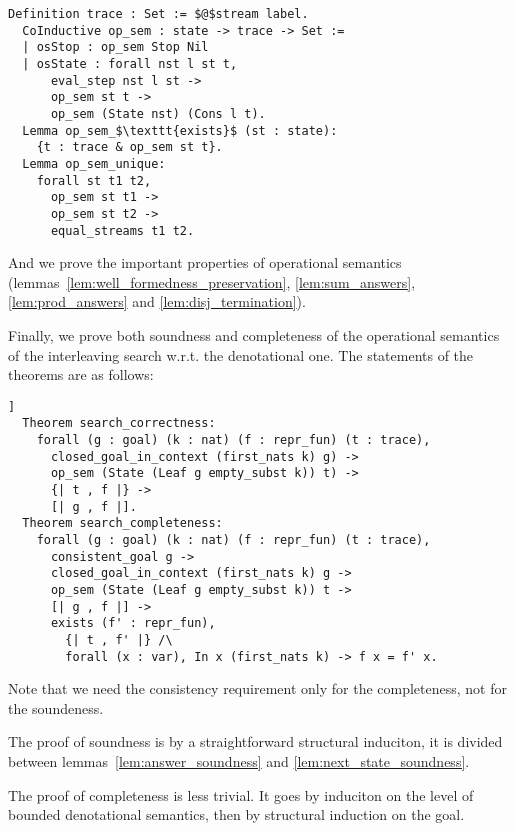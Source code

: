 \begin{lstlisting}[language=Coq]
  Definition trace : Set := $@$stream label.
  CoInductive op_sem : state -> trace -> Set :=
  | osStop : op_sem Stop Nil
  | osState : forall nst l st t,
      eval_step nst l st ->
      op_sem st t ->
      op_sem (State nst) (Cons l t).
  Lemma op_sem_$\texttt{exists}$ (st : state):
    {t : trace & op_sem st t}.
  Lemma op_sem_unique:
    forall st t1 t2,
      op_sem st t1 ->
      op_sem st t2 ->
      equal_streams t1 t2.
\end{lstlisting}

And we prove the important properties of operational semantics (lemmas~\ref{lem:well_formedness_preservation}, \ref{lem:sum_answers}, \ref{lem:prod_answers} and \ref{lem:disj_termination}).

Finally, we prove both soundness and completeness of the operational semantics of the interleaving search w.r.t. the denotational one.
The statements of the theorems are as follows:

\begin{lstlisting}[language=Coq]]
  Theorem search_correctness:
    forall (g : goal) (k : nat) (f : repr_fun) (t : trace),
      closed_goal_in_context (first_nats k) g) ->
      op_sem (State (Leaf g empty_subst k)) t) ->
      {| t , f |} ->
      [| g , f |].
  Theorem search_completeness:
    forall (g : goal) (k : nat) (f : repr_fun) (t : trace),
      consistent_goal g ->
      closed_goal_in_context (first_nats k) g ->
      op_sem (State (Leaf g empty_subst k)) t ->
      [| g , f |] ->
      exists (f' : repr_fun),
        {| t , f' |} /\
        forall (x : var), In x (first_nats k) -> f x = f' x.
\end{lstlisting}

Note that we need the consistency requirement only for the completeness, not for the soundeness.

The proof of soundness is by a straightforward structural induciton, it is divided between lemmas~\ref{lem:answer_soundness} and \ref{lem:next_state_soundness}.

The proof of completeness is less trivial. It goes by induciton on the level of bounded denotational semantics, then by structural induction on the goal.

